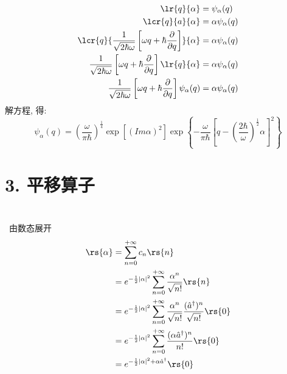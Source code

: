 \begin{frame}  
    \frametitle{}
    \例[ 求相干态在正则位置表象中的波函数]{}
       \[ \begin{aligned}
          \lr{q}{\alpha} & = \psi_\alpha(q) \\
          \lcr{q}{a}{\alpha} & = \alpha\psi_\alpha(q) \\
          \lcr{q}{\frac{1}{\sqrt{2\hbar \omega}}\left[ \omega q +\hbar \frac{\partial }{\partial q}\right]}{\alpha} & = \alpha\psi_\alpha(q) \\
          \frac{1}{\sqrt{2\hbar \omega}}\left[ \omega q +\hbar \frac{\partial }{\partial q}\right]\lr{q}{\alpha} & = \alpha\psi_\alpha(q) \\ 
          \frac{1}{\sqrt{2\hbar \omega}}\left[ \omega q +\hbar \frac{\partial }{\partial q}\right]\psi_\alpha(q) & = \alpha\psi_\alpha(q)\\   
       \end{aligned}\]  
   解方程, 得:
   \[\psi_\alpha(q) = (\frac{\omega}{\pi \hbar})^\frac{1}{4} \exp{[(Im \alpha)^2]}\exp\left\{ -\frac{\omega}{\pi \hbar} \left[ q-(\frac{2 \hbar}{\omega})^\frac{1}{2} \alpha \right]^2 \right\} \]
   \end{frame}

\section{3. 平移算子}

\begin{frame}
    \frametitle{}
    ~\\
    \例 [2. 试证明相干态是真空态的平移] {}
    \解~由数态展开 
    \[\begin{aligned}
          \rs{\alpha} &= \sum_{n=0} ^{+\infty} c_n  \rs{n}  \\
          &=  e^{-\frac{1}{2}\left|\alpha\right|^2}  \sum_{n=0} ^{+\infty}  \frac{\alpha^n}{\sqrt{n!}} \rs{n} \\ 
          &= e^{-\frac{1}{2}\left|\alpha\right|^2}  \sum_{n=0} ^{+\infty}  \frac{\alpha^n}{\sqrt{n!}} \frac{(\hat{a}^\dagger)^n}{\sqrt{n!}}\rs{0} \\ 
          &= e^{-\frac{1}{2}\left|\alpha\right|^2}  \sum_{n=0} ^{+\infty}  \frac{(\alpha\hat{a}^\dagger)^n}{n!}\rs{0} \\ 
          &=  e^{-\frac{1}{2}\left|\alpha\right|^2 + \alpha \hat{a}^\dagger }  \rs{0} 
  \end{aligned}    
    \]
\end{frame}


